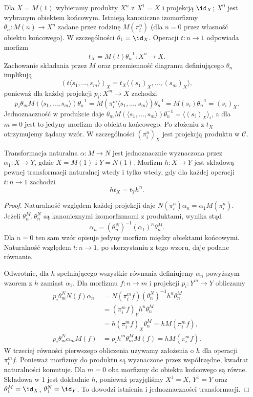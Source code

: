 Dla $X=M(1)$ wybieramy produkty $X^n$ z $X^1=X$ i projekcją $\id_X$; $X^0$ jest wybranym obiektem końcowym. Istnieją kanoniczne izomorfizmy $\theta_n:M(n)\to X^n$ zadane przez rodzinę $M(\pi_i^n)$ (dla $n=0$ przez własność obiektu końcowego). W szczególności $\theta_1=\id_X$. Operacji $t:n\to1$ odpowiada morfizm
\[
 t_X=M(t)\theta_n^{-1}:X^n\to X.
\]
Zachowanie składania przez $M$ oraz przemienność diagramu definiującego $\theta_n$ implikują
\[
 (t\langle s_1,\ldots,s_m\rangle)_X
 =t_X\langle (s_1)_X,\ldots,(s_m)_X\rangle,
\]
ponieważ dla każdej projekcji $p_i:X^m\to X$ zachodzi
\[
 p_i\theta_m M(\langle s_1,\ldots,s_m\rangle)\theta_n^{-1}
 =M(\pi_i^m\langle s_1,\ldots,s_m\rangle)\theta_n^{-1}
 =M(s_i)\theta_n^{-1}=(s_i)_X.
\]
Jednoznaczność w produkcie daje $\theta_m M(\langle s_1,\ldots,s_m\rangle)\theta_n^{-1}=\langle(s_i)_X\rangle_i$, a dla $m=0$ jest to jedyny morfizm do obiektu końcowego. Po złożeniu z $t_X$ otrzymujemy żądany wzór. W szczególności $(\pi_i^n)_X$ jest projekcją produktu w $\mathcal C$.

\begin{stwierdzenie}\label{cat:prop:lawvere-model-morphism}
Transformacja naturalna $\alpha:M\to N$ jest jednoznacznie wyznaczona przez $\alpha_1:X\to Y$, gdzie $X=M(1)$ i $Y=N(1)$. Morfizm $h:X\to Y$ jest składową pewnej transformacji naturalnej wtedy i tylko wtedy, gdy dla każdej operacji $t:n\to1$ zachodzi
\[
 h t_X=t_Y h^n.
\]
\end{stwierdzenie}
\begin{proof}
Naturalność względem każdej projekcji daje $N(\pi_i^n)\alpha_n=\alpha_1M(\pi_i^n)$. Jeżeli $\theta_n^M,\theta_n^N$ są kanonicznymi izomorfizmami z produktami, wynika stąd
\[
 \alpha_n=(\theta_n^N)^{-1}(\alpha_1)^n\theta_n^M.
\]
Dla $n=0$ ten sam wzór opisuje jedyny morfizm między obiektami końcowymi. Naturalność względem $t:n\to1$, po skorzystaniu z tego wzoru, daje podane równanie.

Odwrotnie, dla $h$ spełniającego wszystkie równania definiujemy $\alpha_n$ powyższym wzorem z $h$ zamiast $\alpha_1$. Dla morfizmu $f:n\to m$ i projekcji $p_i:Y^m\to Y$ obliczamy
\[
\begin{aligned}
 p_i\theta_m^N N(f)\alpha_n
 &=N(\pi_i^m f)(\theta_n^N)^{-1}h^n\theta_n^M\\
 &=(\pi_i^m f)_Y h^n\theta_n^M\\
 &=h(\pi_i^m f)_X\theta_n^M
 =hM(\pi_i^m f),\\
 p_i\theta_m^N\alpha_m M(f)
 &=p_i h^m\theta_m^M M(f)
 =hM(\pi_i^m f).
\end{aligned}
\]
W trzeciej równości pierwszego obliczenia używamy założenia o $h$ dla operacji $\pi_i^m f$. Ponieważ morfizmy do produktu są wyznaczone przez współrzędne, kwadrat naturalności komutuje. Dla $m=0$ oba morfizmy do obiektu końcowego są równe. Składowa w $1$ jest dokładnie $h$, ponieważ przyjęliśmy $X^1=X$, $Y^1=Y$ oraz $\theta_1^M=\id_X$, $\theta_1^N=\id_Y$. To dowodzi istnienia i jednoznaczności transformacji.
\end{proof}

